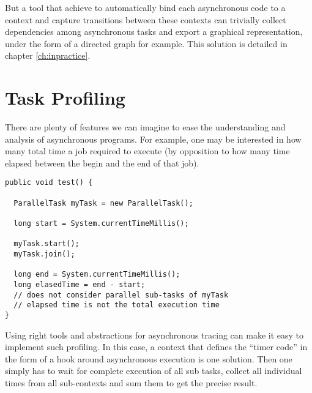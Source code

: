 But a tool that achieve to automatically bind each asynchronous code to a context and capture transitions between these contexts can trivially collect dependencies among asynchronous tasks and export a graphical representation, under the form of a directed graph for example. This solution is detailed in chapter \ref{ch:inpractice}.

\section{Task Profiling}

There are plenty of features we can imagine to ease the understanding and analysis of asynchronous programs. For example, one may be interested in how many total time a job required to execute (by opposition to how many time elapsed between the begin and the end of that job).

\begin{lstlisting}
public void test() {
  
  ParallelTask myTask = new ParallelTask();

  long start = System.currentTimeMillis();

  myTask.start();
  myTask.join();

  long end = System.currentTimeMillis();
  long elasedTime = end - start;
  // does not consider parallel sub-tasks of myTask
  // elapsed time is not the total execution time
}
\end{lstlisting}

Using right tools and abstractions for asynchronous tracing can make it easy to implement such profiling. In this case, a context that defines the ``timer code'' in the form of a hook around asynchronous execution is one solution. Then one simply has to wait for complete execution of all sub tasks, collect all individual times from all sub-contexts and sum them to get the precise result.

